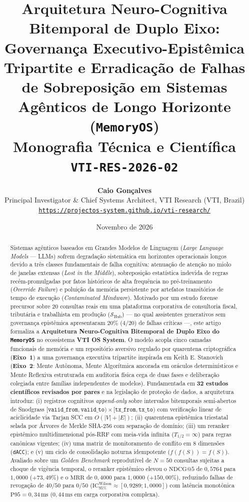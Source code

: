\documentclass[10pt,twocolumn]{article}
\title{\textbf{Arquitetura Neuro-Cognitiva Bitemporal de Duplo Eixo: Governan\c{c}a Executivo-Epist\^emica Tripartite e Erradica\c{c}\~ao de Falhas de Sobreposi\c{c}\~ao em Sistemas Ag\^enticos de Longo Horizonte (\texttt{MemoryOS})}\\[0.4em]
\large Monografia T\'ecnica e Cient\'ifica \texttt{VTI-RES-2026-02}}
\author{\textbf{Caio Gon\c{c}alves}\\
\small Principal Investigator \& Chief Systems Architect, VTI Research (VTI, Brazil)\\
\small \href{https://projectos-system.github.io/vti-research/}{\texttt{https://projectos-system.github.io/vti-research/}}}
\date{Novembro de 2026}
\begin{document}
\maketitle

\begin{abstract}
Sistemas ag\^enticos baseados em Grandes Modelos de Linguagem (\emph{Large Language Models} --- LLMs) sofrem degrada\c{c}\~ao sistem\'atica em horizontes operacionais longos devido a tr\^es classes fundamentais de falha cognitiva: atenua\c{c}\~ao de aten\c{c}\~ao no miolo de janelas extensas (\emph{Lost in the Middle}), sobreposi\c{c}\~ao estat\'istica indevida de regras rec\'em-promulgadas por fatos hist\'oricos de alta frequ\^encia no pr\'e-treinamento (\emph{Override Failure}) e polui\c{c}\~ao da mem\'oria persistente por artefatos transit\'orios de tempo de execu\c{c}\~ao (\emph{Contaminated Mindware}). Motivado por um estudo forense precursor sobre $20$ consultas reais em uma plataforma corporativa de consultoria fiscal, tribut\'aria e trabalhista em produ\c{c}\~ao ($\mathcal{S}_{\mathrm{Hub}}$) --- no qual assistentes generativos sem governan\c{c}a epist\^emica apresentaram $20\%$ ($4/20$) de falhas cr\'iticas ---, este artigo formaliza a \textbf{Arquitetura Neuro-Cognitiva Bitemporal de Duplo Eixo do \texttt{MemoryOS}} no ecossistema \textbf{VTI OS System}. O modelo acopla cinco camadas funcionais de mem\'oria e um reposit\'orio aversivo regulado por quarentena criptogr\'afica (\textbf{Eixo~1}) a uma governan\c{c}a executiva tripartite inspirada em Keith E. Stanovich (\textbf{Eixo~2}: Mente Aut\^onoma, Mente Algor\'itmica ancorada em or\'aculos determin\'isticos e Mente Reflexiva estruturada em auditoria f\'isica cega de duas fases e delibera\c{c}\~ao colegiada entre fam\'ilias independentes de modelos). Fundamentada em \textbf{32 estudos cient\'ificos revisados por pares} e na legisla\c{c}\~ao de prote\c{c}\~ao de dados, a arquitetura introduz: (i) registros cognitivos \emph{append-only} sobre intervalos bitemporais semi-abertos de Snodgrass $[\texttt{valid\_from}, \texttt{valid\_to}) \times [\texttt{tx\_from}, \texttt{tx\_to})$ com verifica\c{c}\~ao linear de aciclicidade via Tarjan SCC em $O(|V| + |E|)$; (ii) quarentena epist\^emica triestatal selada por \'Arvores de Merkle SHA-256 com separa\c{c}\~ao de dom\'inio; (iii) um reranker epist\^emico multidimensional p\'os-RRF com meia-vida infinita ($T_{1/2} = \infty$) para regras can\^onicas vigentes; (iv) uma matriz de monitoramento de conflito em 8 dimens\~oes (\texttt{dACC}); e (v) um ciclo de consolida\c{c}\~ao noturna idempotente ($f(f(S)) = f(S)$). Avaliado sobre um \emph{Golden Benchmark} reprodut\'ivel de $N = 50$ consultas sujeitas a choque de vig\^encia temporal, o reranker epist\^emico elevou o $\mathrm{NDCG@5}$ de $0{,}5764$ para $1{,}0000$ ($+73{,}49\%$) e o $\mathrm{MRR}$ de $0{,}4000$ para $1{,}0000$ ($+150{,}00\%$), reduzindo falhas de revoga\c{c}\~ao de $40/50$ para $0/50$ ($\mathrm{IC}_{95\%}^{\mathrm{Wilson}} \approx [0{,}9289; 1{,}0000]$) com lat\^encia monot\^onica $\mathrm{P95} = 0{,}34\,\mathrm{ms}$ ($0{,}44\,\mathrm{ms}$ em carga corporativa complexa).


\end{abstract}
\end{document}
